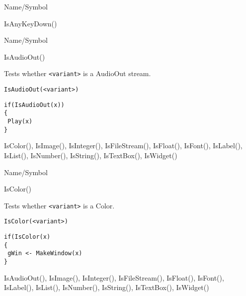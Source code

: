 \rl



\begin{desc}{Name/Symbol}
\item[Name/Symbol]	IsAnyKeyDown()

\item[Description]	

\item[Usage]		

\item[Example]	

\item[See Also]	
\end{desc}

\rl


\begin{desc}{Name/Symbol}
\item[Name/Symbol]	IsAudioOut()

\item[Description]	Tests whether \verb+<variant>+ is a AudioOut stream.

\item[Usage]
\begin{verbatim}
IsAudioOut(<variant>)
\end{verbatim}

\item[Example]
\begin{verbatim}
if(IsAudioOut(x))
{
 Play(x)
}
\end{verbatim}

\item[See Also]	IsColor(), IsImage(), IsInteger(), IsFileStream(), 
		IsFloat(), IsFont(), IsLabel(), IsList(), IsNumber(), 
		IsString(), IsTextBox(), IsWidget()
\end{desc}

\rl


\begin{desc}{Name/Symbol}
\item[Name/Symbol]	IsColor()

\item[Description]	Tests whether \verb+<variant>+ is a Color.

\item[Usage]
\begin{verbatim}
IsColor(<variant>)
\end{verbatim}

\item[Example]
\begin{verbatim}
if(IsColor(x)
{
 gWin <- MakeWindow(x)
}
\end{verbatim}

\item[See Also]		IsAudioOut(), IsImage(), IsInteger(), IsFileStream(), IsFloat(), IsFont(), IsLabel(), IsList(), IsNumber(), IsString(), IsTextBox(), IsWidget()
\end{desc}

